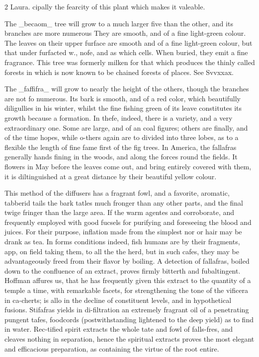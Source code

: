 \documentclass[10pt]{article}
\begin{document}
\begin{multicols}{2}\raggedcolumns
Laura. cipally the fearcity of this plant which makes it valeable.

The \_becaom\_ tree will grow to a much larger five than the other, and its branches are more numerous They are smooth, and of a fine light-green colour. The leaves on their upper furface are smooth and of a fine light-green colour, but that under furfacted w., nofe, and as which cells. When buried, they emit a fine fragrance. This tree was formerly milken for that which produces the thinly called forests in which is now known to be chained forests of places. See Svvxxax.

The \_faffifra\_ will grow to nearly the height of the others, though the branches are not fo numerous. Its bark is smooth, and of a red color, which beautifully diligullies in his winter, whilst the fine fishing green of its leave constitutes its growth because a formation. In thefe, indeed, there is a variety, and a very extraordinary one. Some are large, and of an coal figures; others are finally, and of the time hopes, while o-thers again are to divided into three lobes, as to a flexible the length of fine fame first of the fig trees. In America, the fallafras generally hands fining in the woods, and along the forces round the fields. It flowers in May before the leaves come out, and bring entirely covered with them, it is diltinguished at a great distance by their beautiful yellow colour.

This method of the diffusers has a fragrant fowl, and a favorite, aromatic, tabberid tails the bark tatles much fronger than any other parts, and the final twige fringer than the large area. If the warm agentes and corroborate, and frequently employed with good fucsels for purifying and foreseeing the blood and juices. For their purpose, inflation made from the simplest nor or hair may be drank as tea. In forms conditions indeed, fish humans are by their fragments, app, on field taking them, to all the the herd, but in such cafes, they may be advantageously freed from their flavor by boiling. A detection of fallafras, boiled down to the confluence of an extract, proves firmly bitterth and fubaltingent. Hoffman affures us, that he has frequently given this extract to the quantity of a temple a time, with remarkable facets, for strengthening the tone of the vificera in ca-cherts; is allo in the decline of constituent levels, and in hypothetical fusions. Stifafras yields in di-filtration an extremely fragrant oil of a penetrating pungent tafes, foodcords (postwithstanding lightened to the deep yield) as to find in water. Rec-tified spirit extracts the whole tate and fowl of falls-fres, and cleaves nothing in separation, hence the spiritual extracts proves the most elegant and efficacious preparation, as containing the virtue of the root entire.


\end{multicols}
\end{document}
